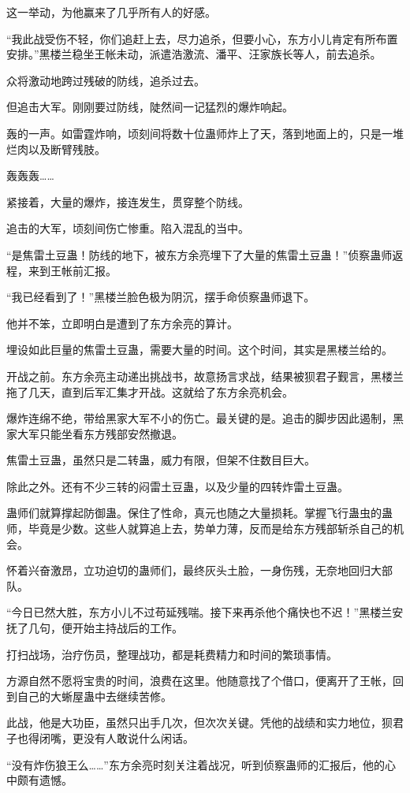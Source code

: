 \begin{this_body}
这一举动，为他赢来了几乎所有人的好感。

“我此战受伤不轻，你们追赶上去，尽力追杀，但要小心，东方小儿肯定有所布置安排。”黑楼兰稳坐王帐未动，派遣浩激流、潘平、汪家族长等人，前去追杀。

众将激动地跨过残破的防线，追杀过去。

但追击大军。刚刚要过防线，陡然间一记猛烈的爆炸响起。

轰的一声。如雷霆炸响，顷刻间将数十位蛊师炸上了天，落到地面上的，只是一堆烂肉以及断臂残肢。

轰轰轰……

紧接着，大量的爆炸，接连发生，贯穿整个防线。

追击的大军，顷刻间伤亡惨重。陷入混乱的当中。

“是焦雷土豆蛊！防线的地下，被东方余亮埋下了大量的焦雷土豆蛊！”侦察蛊师返程，来到王帐前汇报。

“我已经看到了！”黑楼兰脸色极为阴沉，摆手命侦察蛊师退下。

他并不笨，立即明白是遭到了东方余亮的算计。

埋设如此巨量的焦雷土豆蛊，需要大量的时间。这个时间，其实是黑楼兰给的。

开战之前。东方余亮主动递出挑战书，故意扬言求战，结果被狈君子觐言，黑楼兰拖了几天，直到后军汇集才开战。这就给了东方余亮机会。

爆炸连绵不绝，带给黑家大军不小的伤亡。最关键的是。追击的脚步因此遏制，黑家大军只能坐看东方残部安然撤退。

焦雷土豆蛊，虽然只是二转蛊，威力有限，但架不住数目巨大。

除此之外。还有不少三转的闷雷土豆蛊，以及少量的四转炸雷土豆蛊。

蛊师们就算撑起防御蛊。保住了性命，真元也随之大量损耗。掌握飞行蛊虫的蛊师，毕竟是少数。这些人就算追上去，势单力薄，反而是给东方残部斩杀自己的机会。

怀着兴奋激昂，立功迫切的蛊师们，最终灰头土脸，一身伤残，无奈地回归大部队。

“今日已然大胜，东方小儿不过苟延残喘。接下来再杀他个痛快也不迟！”黑楼兰安抚了几句，便开始主持战后的工作。

打扫战场，治疗伤员，整理战功，都是耗费精力和时间的繁琐事情。

方源自然不愿将宝贵的时间，浪费在这里。他随意找了个借口，便离开了王帐，回到自己的大蜥屋蛊中去继续苦修。

此战，他是大功臣，虽然只出手几次，但次次关键。凭他的战绩和实力地位，狈君子也得闭嘴，更没有人敢说什么闲话。

“没有炸伤狼王么……”东方余亮时刻关注着战况，听到侦察蛊师的汇报后，他的心中颇有遗憾。


\end{this_body}

